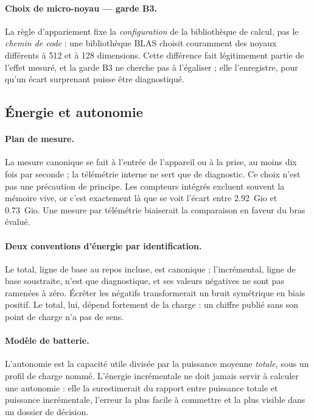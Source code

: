 \documentclass[11pt,a4paper]{article}
\begin{document}
\paragraph{Choix de micro-noyau — garde B3.} La règle d'appariement fixe la
\emph{configuration} de la bibliothèque de calcul, pas le \emph{chemin de code} : une
bibliothèque BLAS choisit couramment des noyaux différents à 512 et à 128
dimensions. Cette différence fait légitimement partie de l'effet mesuré, et la
garde B3 ne cherche pas à l'égaliser ; elle l'enregistre, pour qu'un écart
surprenant puisse être diagnostiqué.

\subsection{Énergie et autonomie}

\paragraph{Plan de mesure.} La mesure canonique se fait à l'entrée de l'appareil ou
à la prise, au moins dix fois par seconde ; la télémétrie interne ne sert que de
diagnostic. Ce choix n'est pas une précaution de principe. Les compteurs intégrés
excluent souvent la mémoire vive, or c'est exactement là que se voit l'écart entre
\num{2,92}~Gio et \num{0,73}~Gio. Une mesure par télémétrie biaiserait
la comparaison en faveur du bras évalué.

\paragraph{Deux conventions d'énergie par identification.} Le total, ligne de base au
repos incluse, est canonique ; l'incrémental, ligne de base soustraite, n'est que
diagnostique, et ses valeurs négatives ne sont pas ramenées à zéro. Écrêter les
négatifs transformerait un bruit symétrique en biais positif. Le total, lui, dépend
fortement de la charge : un chiffre publié sans son point de charge n'a pas de sens.

\paragraph{Modèle de batterie.} L'autonomie est la capacité utile divisée par la
puissance moyenne \emph{totale}, sous un profil de charge nommé. L'énergie
incrémentale ne doit jamais servir à calculer une autonomie : elle la surestimerait
du rapport entre puissance totale et puissance incrémentale, l'erreur la plus facile
à commettre et la plus visible dans un dossier de décision.
\end{document}
